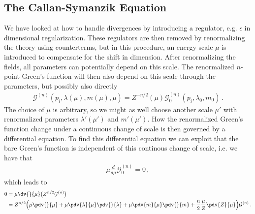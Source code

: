 



















\subsection{The Callan-Symanzik Equation}
We have looked at how to handle divergences by introducing a regulator, e.g. $\epsilon$ in dimensional regularization. These regulators are then removed by renormalizing the theory using counterterms, but in this procedure, an energy scale $\mu$ is introduced to compensate for the shift in dimension. After renormalizing the fields, all parameters can potentially depend on this scale. The renormalized $n$-point Green's function will then also depend on this scale through the parameters, but possibly also directly
\begin{align}
    \mathcal{G}^{(n)}(p_{i},\lambda(\mu),m(\mu),\mu)=Z^{-n/2}(\mu)\mathcal{G}_{0}^{(n)}(p_i,\lambda_{0},m_{0})\,.
\end{align}
The choice of $\mu$ is arbitrary, so we might as well choose another scale $\mu'$ with renormalized parameters $\lambda'(\mu')$ and $m'(\mu')$. How the renormalized Green's function change under a continuous change of scale is then governed by a differential equation. To find this differential equation we can exploit that the bare Green's function is independent of this continous change of scale, i.e. we have that
\begin{align}
    \mu\frac{d}{d\mu}\mathcal{G}_{0}^{(n)}=0\,,
\end{align}
which leads to
\begin{align}
    0&=\mu\dv{}{\mu}\big(Z^{n/2}\mathcal{G}^{(n)}\big)\nonumber
    \\
    &=Z^{n/2}\Big(\mu\pdv{}{\mu}+\mu\pdv{\lambda}{\mu}\pdv{}{\lambda}+\mu\pdv{m}{\mu}\pdv{}{m}+\frac{n}{2}\frac{\mu}{Z}\pdv{Z}{\mu}\Big)\mathcal{G}^{(n)}\,.
\end{align}
